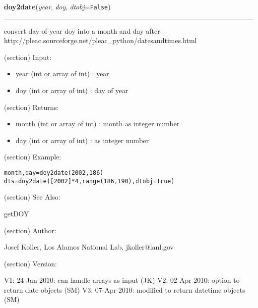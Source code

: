 \hspace{.8\funcindent}\begin{boxedminipage}{\funcwidth}

    \raggedright \textbf{doy2date}(\textit{year}, \textit{doy}, \textit{dtobj}={\tt False})

    \vspace{-1.5ex}

    \rule{\textwidth}{0.5\fboxrule}
\setlength{\parskip}{2ex}
    convert day-of-year doy into a month and day after 
    http://pleac.sourceforge.net/pleac\_python/datesandtimes.html

    (section) Input:

      \begin{itemize}
      \setlength{\parskip}{0.6ex}
        \item year (int or array of int) : year

        \item doy (int or array of int) : day of year

      \end{itemize}

    (section) Returns:

      \begin{itemize}
      \setlength{\parskip}{0.6ex}
        \item month (int or array of int) : month as integer number

        \item day (int or array of int) : as integer number

      \end{itemize}

    (section) Example:

\begin{alltt}
\pysrcprompt{{\textgreater}{\textgreater}{\textgreater} }month, day = doy2date(2002, 186)
\pysrcprompt{{\textgreater}{\textgreater}{\textgreater} }dts = doy2date([2002]*4, range(186,190), dtobj=True)\end{alltt}
    (section) See Also:

      getDOY

    (section) Author:

      Josef Koller, Los Alamos National Lab, jkoller@lanl.gov

    (section) Version:

      V1: 24-Jan-2010: can handle arrays as input (JK) V2: 02-Apr-2010: 
      option to return date objects (SM) V3: 07-Apr-2010: modified to 
      return datetime objects (SM)

\setlength{\parskip}{1ex}
    \end{boxedminipage}

